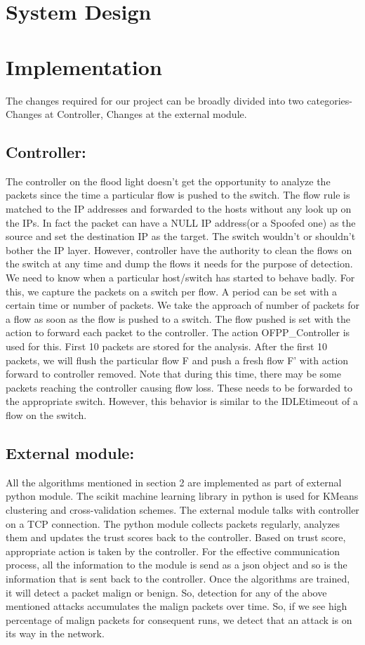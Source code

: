 \documentclass[conference]{IEEEtran}
\begin{document}
\section{\textbf{System Design}}




\section{\textbf{Implementation}}
The changes required for our project can be broadly divided into two categories- Changes at Controller, Changes at the external module.
\subsection{\textbf{Controller:}}
The controller on the flood light doesn’t get the opportunity to analyze the packets since the time a particular flow is pushed to the switch. The flow rule is matched to the IP addresses and forwarded to the hosts without any look up on the IPs. In fact the packet can have a NULL IP address(or a Spoofed one) as the source and set the destination IP as the target. The switch wouldn’t or shouldn’t bother the IP layer. However, controller have the authority to clean the flows on the switch at any time and dump the flows it needs for the purpose of detection. We need to know when a particular host/switch has started to behave badly. For this, we capture the packets on a switch per flow. A period can be set with a certain time or number of packets. We take the approach of number of packets for a flow as soon as the flow is pushed to a switch. The flow pushed is set with the action to forward each packet to the controller. The action OFPP\_Controller is used for this. First 10 packets are stored for the analysis. After the first 10 packets, we will flush the particular flow F and push a fresh flow F’ with action forward to controller removed. Note that during this time, there may be some packets reaching the controller causing flow loss. These needs to be forwarded to the appropriate switch. However, this behavior is similar to the IDLEtimeout of a flow on the switch.
\subsection{\textbf{External module:}}
All the algorithms mentioned in section 2 are implemented as part of external python module. The scikit machine learning library in python is used for KMeans clustering and cross-validation schemes. The external module talks with controller on a TCP connection. The python module collects packets regularly, analyzes them and updates the trust scores back to the controller. Based on trust score, appropriate action is taken by the controller. For the effective communication process, all the information to the module is send as a json object and so is the information that is sent back to the controller. Once the algorithms are trained, it will detect a packet malign or benign. So, detection for any of the above mentioned attacks accumulates the malign packets over time. So, if we see high percentage of malign packets for consequent runs, we detect that an attack is on its way in the network.
\end{document}
